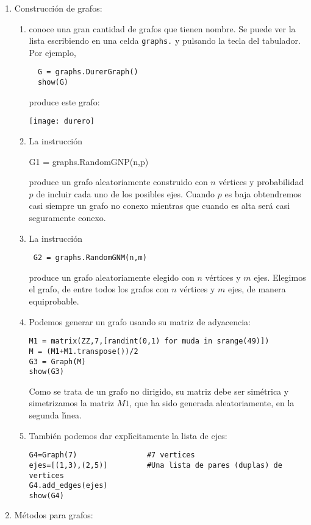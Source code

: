 \begin{enumerate}
 \item {\sc Construcci\'on  de grafos:}
 \begin{enumerate}
 \item {\sage} conoce una gran cantidad de grafos que tienen nombre. Se puede 
ver la lista escribiendo en una celda \lstinline|graphs.| y pulsando la tecla 
del tabulador. Por ejemplo, 
 \begin{lstlisting}
  G = graphs.DurerGraph()
  show(G)
 \end{lstlisting}
\noindent produce este grafo:
\begin{center}
 \texttt{[image: durero]}
\end{center}
\item La instrucci\'on 
\begin{lstinline}
 G1 = graphs.RandomGNP(n,p)
\end{lstinline}
\noindent produce un grafo aleatoriamente construido con $n$ v\'ertices y 
probabilidad $p$ de incluir cada uno de los posibles ejes. Cuando $p$ es baja 
obtendremos casi siempre un grafo no conexo mientras que cuando es alta ser\'a 
casi seguramente conexo.

\item La instrucci\'on 
\begin{lstlisting}
 G2 = graphs.RandomGNM(n,m)
\end{lstlisting}
\noindent produce un grafo aleatoriamente elegido con $n$ v\'ertices y 
$m$ ejes. Elegimos el grafo, de entre todos los grafos con $n$ v\'ertices y $m$ 
ejes, de manera equiprobable.

\item Podemos generar un grafo usando su matriz de adyacencia:
\begin{lstlisting}
M1 = matrix(ZZ,7,[randint(0,1) for muda in srange(49)])
M = (M1+M1.transpose())/2
G3 = Graph(M)
show(G3)
\end{lstlisting}

Como se trata de un grafo no dirigido, su matriz debe ser sim\'etrica y 
simetrizamos la matriz $M1$, que ha sido generada aleatoriamente,  en la 
segunda l\'{\i}nea. 

\item Tambi\'en podemos dar expl\'{\i}citamente la lista de ejes:
\begin{lstlisting}
G4=Graph(7)                #7 vertices
ejes=[(1,3),(2,5)]         #Una lista de pares (duplas) de vertices 
G4.add_edges(ejes)
show(G4)
\end{lstlisting}
\end{enumerate}
\item {\sc M\'etodos para grafos:}


\end{enumerate}
